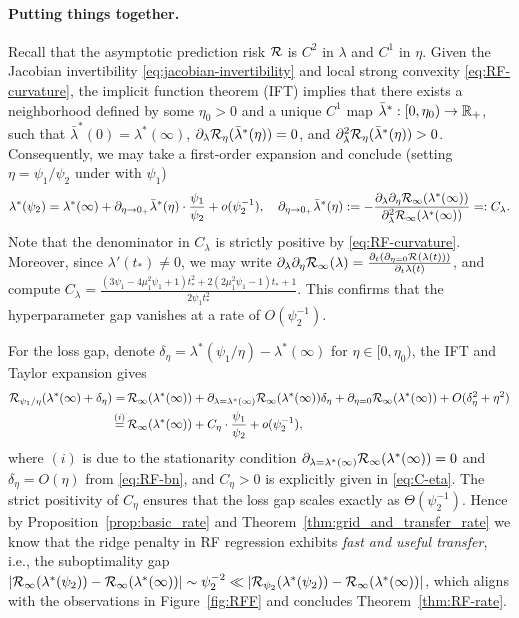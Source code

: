 \documentclass{article} %
\begin{document}
\paragraph{Putting things together.} Recall that the asymptotic prediction risk ${\mathcal R}$ is $C^2$ in $\lambda$ and $C^1$ in $\eta$. 
Given the Jacobian invertibility \eqref{eq:jacobian-invertibility} and local strong convexity \eqref{eq:RF-curvature}, the implicit function theorem (IFT) implies that there exists a neighborhood defined by some $\eta_0>0$ and a unique $C^1$ map $\bar{\lambda}^*: [0,\eta_0)\to\mathbb{R}_+$, such that $\bar{\lambda}^*(0) = \lambda^*(\infty)$, $\partial_{\lambda} {\mathcal R}_{\eta}(\bar{\lambda}^*(\eta))=0$, and $\partial_{\lambda}^2 {\mathcal R}_{\eta}(\bar{\lambda}^*(\eta)) > 0$. Consequently, we may take a first-order expansion and conclude (setting $\eta=\psi_1/\psi_2$ under with $\psi_1$)
\begin{align}
    \lambda^*(\psi_2) = \lambda^*(\infty) + \partial_{\eta\to 0_+}\bar{\lambda}^*(\eta)\cdot \frac{\psi_1}{\psi_2} + o(\psi_2^{-1}), \quad
    \partial_{\eta\to 0_+}\bar{\lambda}^*(\eta) :=  -\frac{\partial_{\lambda}\partial_{\eta}{\mathcal R}_{\infty}(\lambda^*(\infty))}{\partial_{\lambda}^2{\mathcal R}_{\infty}(\lambda^*(\infty))} =: C_\lambda. 
    \label{eq:RF-bn}
\end{align}
Note that the denominator in $C_\lambda$ is strictly positive by \eqref{eq:RF-curvature}. Moreover, since $\lambda'(t_*)\neq 0$, we may write $\partial_{\lambda}\partial_{\eta}{\mathcal R}_{\infty}(\lambda) = \frac{\partial_t(\partial_{\eta=0}{\mathcal R}(\lambda(t)))}{\partial_t\lambda(t)}$, and compute
$
C_\lambda = \frac{(3\psi_1-4\mu_1^2\psi_1+1)t_*^2 + 2(2\mu_1^2\psi_1-1)t_* +1}{2\psi_1 t_*^2}. 
$ 
This confirms that the hyperparameter gap vanishes at a rate of $O(\psi_2^{-1})$. 

For the loss gap, denote $\delta_{\eta} = \lambda^*(\psi_1/\eta) - \lambda^*(\infty)$ for $\eta\in [0,\eta_0)$, the IFT and Taylor expansion gives
\begin{align*}
{\mathcal R}_{\psi_1/\eta}(\lambda^*(\infty) + \delta_\eta) 
=&\, {\mathcal R}_{\infty}(\lambda^*(\infty)) + \partial_{\lambda=\lambda^*(\infty)} {\mathcal R}_{\infty}(\lambda^*(\infty)) \delta_\eta + \partial_{\eta=0} {\mathcal R}_{\infty}(\lambda^*(\infty)) + O(\delta_\eta^2 + \eta^2) \\
\overset{(i)}{=}&\,
{\mathcal R}_{\infty}(\lambda^*(\infty)) + C_\eta\cdot \frac{\psi_1}{\psi_2} + o(\psi_2^{-1}),
\end{align*}
where $(i)$ is due to the stationarity condition $\partial_{\lambda=\lambda^*(\infty)} {\mathcal R}_{\infty}(\lambda^*(\infty))=0$ and $\delta_\eta = O(\eta)$ from \eqref{eq:RF-bn}, and $C_\eta>0$ is explicitly given in \eqref{eq:C-eta}. The strict positivity of $C_\eta$ ensures that the loss gap scales exactly as $\Theta(\psi_2^{-1})$. Hence by Proposition~\ref{prop:basic_rate} and Theorem~\ref{thm:grid_and_transfer_rate} we know that the ridge penalty in RF regression exhibits \textit{fast and useful transfer}, i.e., the suboptimality gap $\abs{{\mathcal R}_\infty(\lambda^*(\psi_2)) - {\mathcal R}_\infty(\lambda^*(\infty))} \sim \psi_2^{-2} \ll \abs{{\mathcal R}_{\psi_2}(\lambda^*(\psi_2)) - {\mathcal R}_{\infty}(\lambda^*(\infty))}$, which aligns with the observations in Figure~\ref{fig:RFF} and concludes Theorem~\ref{thm:RF-rate}. 
\end{document}
